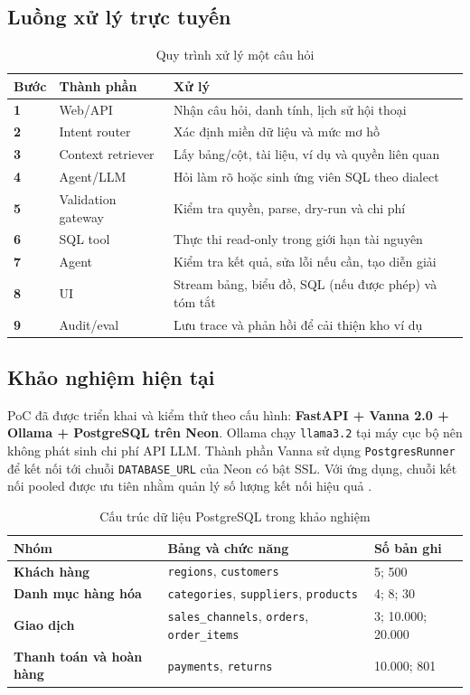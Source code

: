 \documentclass[12pt,a4paper]{article}
\begin{document}
\subsection{Luồng xử lý trực tuyến}

\begin{table}[H]
\centering
\caption{Quy trình xử lý một câu hỏi}
\begin{tabularx}{\textwidth}{>{\centering\arraybackslash\bfseries}p{1.1cm}p{4.0cm}X}
\toprule
Bước & Thành phần & Xử lý\\
\midrule
1 & Web/API & Nhận câu hỏi, danh tính, lịch sử hội thoại\\
2 & Intent router & Xác định miền dữ liệu và mức mơ hồ\\
3 & Context retriever & Lấy bảng/cột, tài liệu, ví dụ và quyền liên quan\\
4 & Agent/LLM & Hỏi làm rõ hoặc sinh ứng viên SQL theo dialect\\
5 & Validation gateway & Kiểm tra quyền, parse, dry-run và chi phí\\
6 & SQL tool & Thực thi read-only trong giới hạn tài nguyên\\
7 & Agent & Kiểm tra kết quả, sửa lỗi nếu cần, tạo diễn giải\\
8 & UI & Stream bảng, biểu đồ, SQL (nếu được phép) và tóm tắt\\
9 & Audit/eval & Lưu trace và phản hồi để cải thiện kho ví dụ\\
\bottomrule
\end{tabularx}
\end{table}

\subsection{Khảo nghiệm hiện tại}

PoC đã được triển khai và kiểm thử theo cấu hình:
\textbf{FastAPI + Vanna 2.0 + Ollama + PostgreSQL trên Neon}. Ollama chạy
\texttt{llama3.2} tại máy cục bộ nên không phát sinh chi phí API LLM. Thành
phần Vanna sử dụng \texttt{PostgresRunner} để kết nối tới chuỗi
\texttt{DATABASE\_URL} của Neon có bật SSL. Với ứng dụng, chuỗi kết nối pooled
được ưu tiên nhằm quản lý số lượng kết nối hiệu quả \cite{neon2026}.

\begin{table}[H]
\centering
\caption{Cấu trúc dữ liệu PostgreSQL trong khảo nghiệm}
\begin{tabularx}{\textwidth}{>{\bfseries}p{3.5cm}X p{2.7cm}}
\toprule
Nhóm & Bảng và chức năng & Số bản ghi\\
\midrule
Khách hàng & \texttt{regions}, \texttt{customers} & 5; 500\\
Danh mục hàng hóa & \texttt{categories}, \texttt{suppliers},
\texttt{products} & 4; 8; 30\\
Giao dịch & \texttt{sales\_channels}, \texttt{orders},
\texttt{order\_items} & 3; 10.000; 20.000\\
Thanh toán và hoàn hàng & \texttt{payments}, \texttt{returns}
& 10.000; 801\\
\bottomrule
\end{tabularx}
\end{table}
\end{document}
